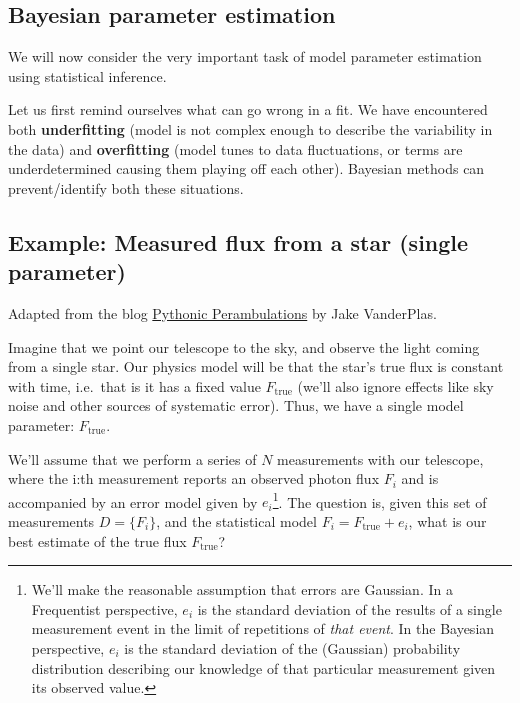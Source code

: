 \documentclass[%
oneside,                 %
final,                   %
10pt]{article}
\newenvironment{block_mdfboxadmon}[1][]{
\begin{block_mdfboxmdframed}[frametitle=#1]
}
{
\end{block_mdfboxmdframed}
}
\begin{document}
\subsection{Bayesian parameter estimation}

\begin{block_mdfboxadmon}[]
We will now consider the very important task of model parameter estimation using statistical inference. 

Let us first remind ourselves what can go wrong in a fit. We have encountered both \textbf{underfitting} (model is not complex enough to describe the variability in the data) and \textbf{overfitting} (model tunes to data fluctuations, or terms are underdetermined causing them playing off each other). Bayesian methods can prevent/identify both these situations.
\end{block_mdfboxadmon} %



\subsection{Example: Measured flux from a star (single parameter)}
Adapted from the blog \href{{http://jakevdp.github.io}}{Pythonic Perambulations} by Jake VanderPlas.

Imagine that we point our telescope to the sky, and observe the light coming from a single star. Our physics model will be that the star's true flux is constant with time, i.e.~that is it has a fixed value $F_\mathrm{true}$ (we'll also ignore effects like sky noise and other sources of systematic error). Thus, we have a single model parameter: $F_\mathrm{true}$.

We'll assume that we perform a series of $N$ measurements with our telescope, where the i:th measurement reports an observed photon flux $F_i$ and is accompanied by an error model given by $e_i$\footnote{We'll make the reasonable assumption that errors are Gaussian. In a Frequentist perspective, $e_i$ is the standard deviation of the results of a single measurement event in the limit of repetitions of \emph{that event}. In the Bayesian perspective, $e_i$ is the standard deviation of the (Gaussian) probability distribution describing our knowledge of that particular measurement given its observed value.}.
The question is, given this set of measurements $D = \{F_i\}$, and the statistical model $F_i = F_\mathrm{true} + e_i$, what is our best estimate of the true flux $F_\mathrm{true}$?
\end{document}
